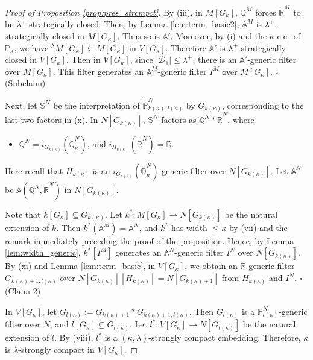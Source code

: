 \documentclass[a4paper,12pt,reqno,oneside]{amsart}
\theoremstyle{plain}
\newcommand{\mbb}{\mathbb}
\newcommand{\mcal}{\mathcal}
\begin{document}
\begin{proof}[Proof of Proposition \ref{prop:pres_strcmpct}]
By (iii), in $M[ G_\kappa ]$, $\mbb{Q}^M$ forces $\dot{\mbb{R}}^M$ to be $\lambda^+$-strategically closed. Then, by Lemma \ref{lem:term_basic2}, $\mbb{A}^M$ is $\lambda^+$-strategically closed in $M[ G_\kappa ]$. Thus so is $\mbb{A}'$. Moreover,  by (i) and the $\kappa$-c.c.~of $\mbb{P}_\kappa$, we have ${}^\lambda M[ G_\kappa ] \subseteq M[ G_\kappa ]$ in $V[ G_\kappa ]$. Therefore $\mbb{A}'$ is $\lambda^+$-strategically closed in $V[ G_\kappa ]$. Then in $V[ G_\kappa ]$, since $| \mcal{D}_1 | \leq \lambda^+$, there is an $\mbb{A}'$-generic filter over $M[ G_\kappa ]$. This filter generates an $\mbb{A}^M$-generic filter $I^M$ over $M[ G_\kappa ]$.
\hfill $\square$(Subclaim)

\medskip
Next, let $\mbb{S}^N$ be the interpretation of $\dot{\mbb{P}}_{k( \kappa ) , l( \kappa )}^N$ by $G_{k( \kappa )}$, corresponding to the last two factors in (x). In $N[ G_{k( \kappa )} ]$, $\mbb{S}^N$ factors as $\mbb{Q}^N * \dot{\mbb{R}}^N$, where
\begin{itemize}
\item[(xi)] $\mbb{Q}^N = i_{G_{k( \kappa )}} ( \dot{\mbb{Q}}_\kappa^N )$, and $i_{H_{k( \kappa )}} ( \dot{\mbb{R}}^N ) = \mbb{R}$.
\end{itemize}
Here recall that $H_{k( \kappa )}$ is an $i_{G_{k( \kappa )}} ( \dot{\mbb{Q}}_\kappa^N )$-generic filter over $N[ G_{k( \kappa )} ]$. Let $\mbb{A}^N$ be $\mbb{A} ( \mbb{Q}^N , \dot{\mbb{R}}^N )$ in $N[ G_{k( \kappa )} ]$.

Note that $k[ G_\kappa ] \subseteq G_{k( \kappa )}$. Let $k^* : M[ G_\kappa ] \to N[ G_{k( \kappa )} ]$ be the natural extension of $k$. Then $k^* ( \mbb{A}^M ) = \mbb{A}^N$, and $k^*$ has width $\leq \kappa$ by (vii) and the remark immediately preceding the proof of the proposition. Hence, by Lemma \ref{lem:width_generic}, $k^* [ I^M ]$ generates an $\mbb{A}^N$-generic filter $I^N$ over $N[ G_{k( \kappa )} ]$. By (xi) and Lemma \ref{lem:term_basic}, in $V[ G_\kappa ]$, we obtain an $\mbb{R}$-generic filter $G_{k( \kappa ) + 1 , l( \kappa )}$ over $N[ G_{k( \kappa )} ][ H_{k( \kappa )} ] = N[ G_{k( \kappa ) + 1} ]$ from $H_{k( \kappa )}$ and $I^N$.
\hfill $\square$(Claim 2)

\medskip
In $V[ G_\kappa ]$, let $G_{l( \kappa )} := G_{k( \kappa ) + 1} * G_{k( \kappa) + 1 , l( \kappa )}$. Then $G_{l( \kappa )}$ is a $\mbb{P}_{l( \kappa )}^N$-generic filter over $N$, and $l[ G_\kappa ] \subseteq G_{l( \kappa )}$. Let $l^* : V[ G_\kappa ] \to N[ G_{l( \kappa )} ]$ be the natural extension of $l$. By (viii), $l^*$ is a $( \kappa , \lambda )$-strongly compact embedding. Therefore, $\kappa$ is $\lambda$-strongly compact in $V[ G_\kappa ]$.
\end{proof}
\end{document}
